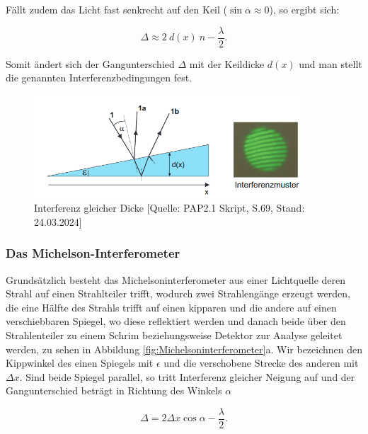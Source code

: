 \documentclass{article}
\begin{document}
Fällt zudem das Licht fast senkrecht auf den Keil ($\sin{\alpha} \approx 0$), so ergibt sich:

\begin{equation}
    \Delta \approx 2 \ d(x) \ n - \frac{\lambda}{2}.
\end{equation}

Somit ändert sich der Gangunterschied $\Delta$ mit der Keildicke $d(x)$ und man stellt die genannten Interferenzbedingungen fest.

\phantom{.}

\begin{figure}[!h]
    \centering
    \includegraphics[width=0.9\textwidth]{graphics/skript/gleiche dicke.png}
    \caption{Interferenz gleicher Dicke [Quelle: PAP2.1 Skript, S.69, Stand: 24.03.2024]}
    \label{fig:gleicheDicke}
\end{figure}


\newpage
\subsubsection{Das Michelson-Interferometer}

Grundsätzlich besteht das Michelsoninterferometer aus einer Lichtquelle deren Strahl auf einen Strahlteiler trifft, wodurch zwei Strahlengänge erzeugt werden, die eine Hälfte des Strahls trifft auf einen kipparen und die andere auf einen verschiebbaren Spiegel, wo diese reflektiert werden und danach beide über den Strahlenteiler zu einem Schrim beziehungsweise Detektor zur Analyse geleitet werden, zu sehen in Abbildung \ref{fig:Michelsoninterferometer}a. Wir bezeichnen den Kippwinkel des einen Spiegels mit $\epsilon$ und die verschobene Strecke des anderen mit $\Delta x$. Sind beide Spiegel parallel, so tritt Interferenz gleicher Neigung auf und der Gangunterschied beträgt in Richtung des Winkels $\alpha$

\begin{equation}
    \Delta = 2 \Delta x \cos{\alpha} - \frac{\lambda}{2}.
\end{equation}
\end{document}
